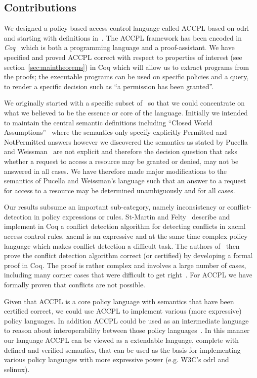 \documentclass[runningheads,a4paper]{llncs}
\begin{document}
\subsection{Contributions}\label{sec:contribs}

We designed a policy based access-control language called \ac{ACCPL} based on \ac{odrl} and starting with definitions in~\cite{pucella2006}. The \ac{ACCPL} framework has been encoded in \emph{Coq}~\cite{BC04} which is both a programming language and a proof-assistant. We have specified and proved \ac{ACCPL} correct with respect to properties of interest (see section~\ref{sec:maintheorems}) in Coq which will allow us to extract programs from the proofs; the executable programs can be used on specific policies and a query, to render a specific decision such as ``a permission has been granted''. 

We originally started with a specific subset of~\cite{pucella2006} so that we could concentrate on what we believed to be the essence or core of the language. Initially we intended to maintain the central semantic definitions including ``Closed World Assumptions''~\cite{pucella2006} where the semantics only specify explicitly Permitted and NotPermitted answers however we discovered the semantics as stated by Pucella and Weissman~\cite{pucella2006} are not explicit and therefore the decision question that asks whether a request to access a resource may be granted or denied, may not be answered in all cases. We have therefore made major modifications to the semantics of Pucella and Weissman's language such that an answer to a request for access to a resource may be determined unambiguously and for all cases. 
    
Our results subsume an important sub-category, namely inconsistency or conflict-detection in policy expressions or rules. St-Martin and Felty~\cite{felty16} describe and implement in Coq a conflict detection algorithm for detecting conflicts in \ac{xacml} access control rules. \ac{xacml} is an expressive and at the same time complex policy language which makes conflict detection a difficult task. The authors of~\cite{felty16} then prove the conflict detection algorithm correct (or certified) by developing a formal proof in Coq. The proof is rather complex and involves a large number of cases, including many corner cases that were difficult to get right~\cite{felty16}. For \ac{ACCPL} we have formally proven that conflicts are not possible.

Given that \ac{ACCPL} is a core policy language with semantics that have been certified correct, we could use \ac{ACCPL} to implement various (more expressive) policy languages. In addition \ac{ACCPL} could be used as an intermediate language to reason about interoperability between those policy languages~\cite{prados2005interoperability,maronas2009architecture}. In this manner our language \ac{ACCPL} can be viewed as a extendable language, complete with defined and verified semantics, that can be used as the basis for implementing various policy languages with more expressive power (e.g. W3C's \ac{odrl} and \ac{selinux}). 
\end{document}
